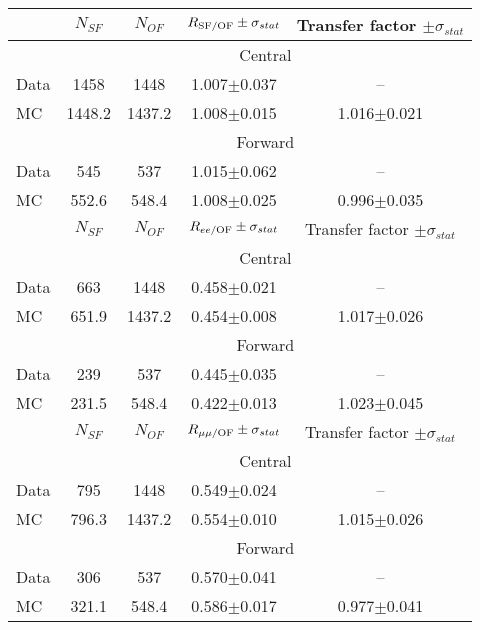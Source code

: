 
\begin{table}[hbtp]
 \renewcommand{\arraystretch}{1.3}
 \setlength{\belowcaptionskip}{6pt}
 \centering
 \caption{
     }
  \label{tab:rSFOF}
\begin{tabular}{l|c|c|c|c}     
 & $N_{SF}$ & $N_{OF}$ & $ R_{\text{SF/OF}} \pm \sigma_{stat}$ & Transfer factor $\pm \sigma_{stat}$  \\    
\hline
&  \multicolumn{4}{c}{Central} \\
\hline
 Data & 1458 & 1448 & 1.007$\pm$0.037 & -- \\
 MC & 1448.2 & 1437.2 & 1.008$\pm$0.015 & 1.016$\pm$0.021\\
 
 
    \hline 
& \multicolumn{4}{c}{Forward} \\
\hline
 Data & 545 & 537 & 1.015$\pm$0.062 & -- \\
 MC & 552.6 & 548.4 & 1.008$\pm$0.025 & 0.996$\pm$0.035\\

\hline\hline
 & $N_{SF}$ & $N_{OF}$ & $ R_\text{$ee$/OF} \pm \sigma_{stat}$ & Transfer factor $\pm \sigma_{stat}$  \\    
\hline
&  \multicolumn{4}{c}{Central} \\
\hline
 Data & 663 & 1448 & 0.458$\pm$0.021 & -- \\
 MC & 651.9 & 1437.2 & 0.454$\pm$0.008 & 1.017$\pm$0.026\\
 
 
    \hline 
& \multicolumn{4}{c}{Forward} \\
\hline
 Data & 239 & 537 & 0.445$\pm$0.035 & -- \\
 MC & 231.5 & 548.4 & 0.422$\pm$0.013 & 1.023$\pm$0.045\\

\hline\hline
 & $N_{SF}$ & $N_{OF}$ & $ R_\text{$\mu\mu$/OF} \pm \sigma_{stat}$ & Transfer factor $\pm \sigma_{stat}$  \\    
\hline
& \multicolumn{4}{c}{Central} \\
\hline
 Data & 795 & 1448 & 0.549$\pm$0.024 & -- \\
 MC & 796.3 & 1437.2 & 0.554$\pm$0.010 & 1.015$\pm$0.026\\
 
 
    \hline 
 & \multicolumn{4}{c}{Forward} \\
\hline
 Data & 306 & 537 & 0.570$\pm$0.041 & -- \\
 MC & 321.1 & 548.4 & 0.586$\pm$0.017 & 0.977$\pm$0.041\\

  
\end{tabular}  
\end{table}
